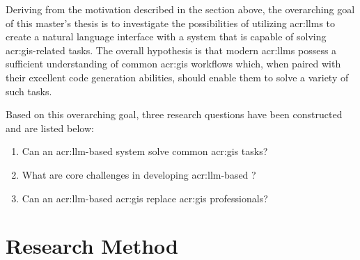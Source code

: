 \begin{comment}
Potentially, how well the goals have been met (and how well the research questions have been answered)
is a theme that you should return to towards the end of the thesis (so in Chapter~\ref{cha:conclusion} and/or Chapter~\ref{cha:discussion}).

For a Specialisation Project, the goal would primarily be to get up to speed with the research field, so the research questions will rather be
limited to exploring what the state-of-the-art is, what methods and data have been used, etc.
A secondary goal of the specialisation is to frame the research questions and goals of the Master's Thesis.
Note that a major difference between the Specialisation Project and the Master's Thesis is that the Master's Thesis work \textit{has\/} to
introduce new research.
Of course the Specialisation Project can also introduce novel work, but there is no such requirement --- and most commonly it does not,
since the core of the project really is to figure out what is ``old'' before you can introduce something which is new.
\end{comment}

Deriving from the motivation described in the section above, the overarching goal of this master's thesis is to investigate the possibilities of utilizing \glspl{acr:llm} to create a natural language interface with a system that is capable of solving \acrshort{acr:gis}-related tasks. The overall hypothesis is that modern \glspl{acr:llm} possess a sufficient understanding of common \acrshort{acr:gis} workflows which, when paired with their excellent code generation abilities, should enable them to solve a variety of such tasks.

Based on this overarching goal, three research questions have been constructed and are listed below:

\begin{enumerate}
    \item Can an \gls{acr:llm}-based system solve common \acrshort{acr:gis} tasks? \label{rq:gis-question-answering}
    \item What are core challenges in developing \acrshort{acr:llm}-based ? \label{rq:development-challenges}
    \item Can an \acrshort{acr:llm}-based \acrshort{acr:gis} replace \acrshort{acr:gis} professionals? \label{rq:replaing-gis-professionals}
\end{enumerate}

\section{Research Method}
\label{sec:research-method}

